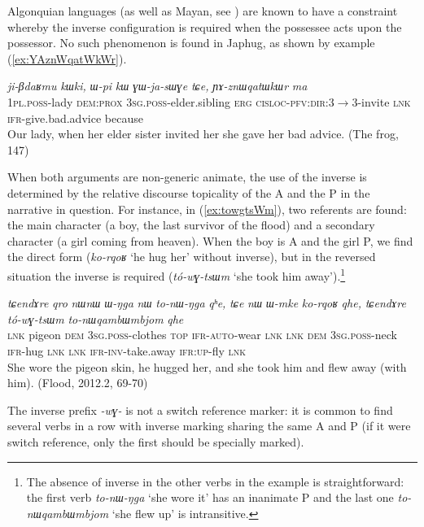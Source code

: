 \documentclass[oneside,a4paper,11pt]{article}
\newcommand{\ipa}[1]{\textit{\phon\mbox{#1}}} %
\newcommand{\refb}[1]{(\ref{#1})}
\begin{document}
 Algonquian languages (as well as Mayan, see \citealt{aissen97obviation}) are known to have a constraint whereby the inverse configuration is required when the possessee acts upon the possessor. No such phenomenon is found in Japhug, as shown by   example \refb{ex:YAznWqatWkWr}.
\begin{exe}
\ex \label{ex:YAznWqatWkWr}
\gll   \ipa{ji-βdaʁmu} 	\ipa{kɯki,} 	\ipa{ɯ-pi} 	\ipa{kɯ} 	\ipa{ɣɯ-ja-sɯɣe} 	\ipa{tɕe,} 	\ipa{ɲɤ-znɯqatɯkɯr} 	\ipa{ma} \\
\textsc{1pl.poss}-lady \textsc{dem:prox} \textsc{3sg.poss}-elder.sibling \textsc{erg} \textsc{cisloc-pfv:dir:3}$\rightarrow$3-invite \textsc{lnk} \textsc{ifr}-give.bad.advice because \\
\glt Our lady, when her elder sister invited her she gave her bad advice. (The frog, 147)
\end{exe}

 
When both arguments are non-generic animate, the use of the inverse is determined by the relative discourse topicality of the A and the P in the narrative in question. For instance, in \refb{ex:towgtsWm}, two referents are found: the main character (a boy, the last survivor of the flood) and a secondary character (a girl coming from heaven). When the boy is A and the girl P, we find the direct form (\ipa{ko-rqoʁ}  `he hug her' without inverse), but in the reversed situation the inverse is required (\ipa{tó-wɣ-tsɯm} `she took him away').\footnote{The absence of inverse in the other verbs in the example is straightforward: the first verb 	\ipa{to-nɯ-ŋga}  `she wore it' has an inanimate P and the last one \ipa{to-nɯqambɯmbjom}  `she flew up' is intransitive. }

 \begin{exe}
\ex \label{ex:towgtsWm} 
\gll
\ipa{tɕendɤre} 	\ipa{qro} 	\ipa{nɯnɯ} 	\ipa{ɯ-ŋga} 	\ipa{nɯ} 	\ipa{to-nɯ-ŋga} 	\ipa{qʰe,}  \ipa{tɕe} 	\ipa{nɯ} 	\ipa{ɯ-mke} 	\ipa{ko-rqoʁ} 	\ipa{qhe,} \ipa{tɕendɤre} 	\ipa{tó-wɣ-tsɯm} 	\ipa{to-nɯqambɯmbjom} 	\ipa{qhe} \\
\textsc{lnk} pigeon \textsc{dem} \textsc{3sg.poss}-clothes \textsc{top} \textsc{ifr-auto}-wear \textsc{lnk} \textsc{lnk} \textsc{dem} \textsc{3sg.poss}-neck \textsc{ifr}-hug \textsc{lnk} \textsc{lnk} \textsc{ifr-inv}-take.away \textsc{ifr:up}-fly \textsc{lnk} \\
\glt She wore the pigeon skin, he hugged her, and she took him and flew away (with him). (Flood, 2012.2, 69-70)
\end{exe}

The inverse prefix \ipa{-wɣ-} is not a switch reference marker: it is common to find several verbs in a row with inverse marking sharing the same A and P (if it were switch reference, only the first should be specially marked).
\end{document}
